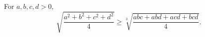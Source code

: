 For $a, b, c, d > 0$,
\[ \sqrt{\frac{a^2 + b^2 + c^2 + d^2}{4}} \geq \sqrt[3]{\frac{abc + abd + acd + bcd}{4}}. \]

